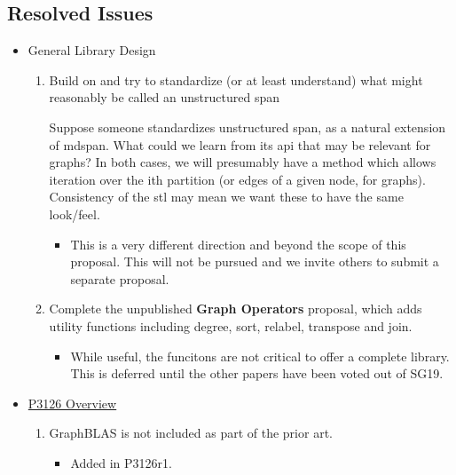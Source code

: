 \subsection{Resolved Issues}
\begin{itemize}
      \item General Library Design
            \begin{enumerate}
                  \item Build on  and try to standardize (or at least understand) what might reasonably be called an unstructured span
                              
                  Suppose someone standardizes unstructured span, as a natural extension of mdspan. What could we 
                  learn from its api that may be relevant for graphs? In both cases, we will presumably have a method which allows iteration over the ith partition 
                  (or edges of a given node, for graphs). Consistency of the stl may mean we want these to have the same look/feel.
                  \begin{itemize}
                        \item This is a very different direction and beyond the scope of this proposal. This will not be pursued
                              and we invite others to submit a separate proposal.
                  \end{itemize}
            \item Complete the unpublished \textbf{Graph Operators} proposal, which adds utility functions including degree, sort, relabel, transpose and join.
                  \begin{itemize}
                        \item While useful, the funcitons are not critical to offer a complete library. This is deferred until the other papers 
                              have been voted out of SG19.
                  \end{itemize}
            \end{enumerate}
      \item \href{https://www.wg21.link/P3126}{P3126 Overview}
            \begin{enumerate}
                  \item GraphBLAS is not included as part of the prior art.
                        \begin{itemize}
                              \item Added in P3126r1.
                        \end{itemize}

\end{enumerate}
\end{itemize}
